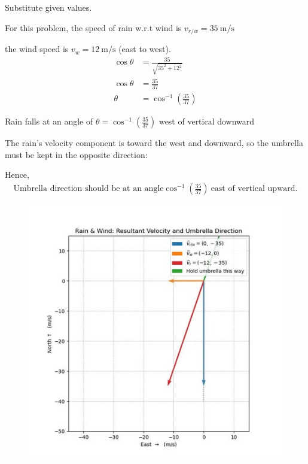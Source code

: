 \documentclass[journal]{IEEEtran}
\begin{document}
Substitute given values.

For this problem, the speed of rain w.r.t wind is $v_{r/w}=35\ \text{m/s}$ 

the wind speed is $v_w=12\ \text{m/s}$ (east to west).
\begin{align}
    \cos\theta &= \frac{35}{\sqrt{35^2 + 12^2}} \\
    \cos\theta &= \frac{35}{37} \\ 
        \theta &= \cos^{-1}\!\left(\frac{35}{37}\right)
\end{align}



Rain falls at an angle of 
$\theta=\cos^{-1}\!\left(\frac{35}{37}\right)$ west of vertical downward

The rain's velocity component is toward the west and downward, so the umbrella must be kept in the opposite direction:

Hence,
\begin{align}
 \text{Umbrella direction should be at an angle} \cos^{-1}\!\left(\frac{35}{37}\right)\ \text{east of vertical upward.} \nonumber
\end{align}


\begin{figure}[h]
    \centering
    \includegraphics[scale=0.5]{figs/1.2.24.jpg}
    \caption{}
    \label{fig:1}
\end{figure}
\end{document}
